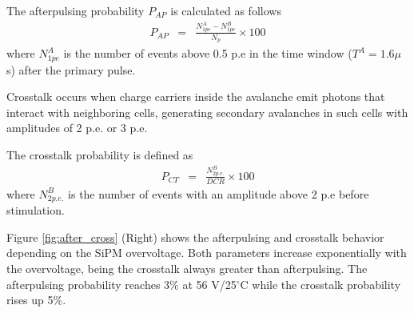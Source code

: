 \documentclass[a4paper,11pt]{article}
\begin{document}


The afterpulsing probability $P_{AP}$ is calculated as follows
\begin{eqnarray}
    P_{AP} &=& \frac{N_{1pe}^A-N_{1pe}^B}{N_p}\times 100
    \label{AP_eq}
\end{eqnarray}
where $N_{1pe}^A$ is the number of events above 0.5 p.e in the time window ($T^A = 1.6 \mu$ s) after the primary pulse. 

Crosstalk occurs when charge carriers inside the avalanche emit photons that interact with neighboring cells, generating secondary avalanches in such cells with amplitudes of 2 p.e. or 3 p.e.



The crosstalk probability is defined as
\begin{eqnarray}
    P_{CT} &=&\frac{N_{2p.e.}^B}{DCR}\times 100
    \label{CT_eq}
\end{eqnarray}
where $N_{2p.e.}^B$ is the number of events with an amplitude above 2 p.e before stimulation.

Figure \ref{fig:after_cross} (Right) shows the afterpulsing and crosstalk behavior depending on the SiPM overvoltage. Both parameters increase exponentially with the overvoltage, being the crosstalk always greater than afterpulsing. The afterpulsing probability reaches 3$\%$ at 56 V/25$^{\circ}$C while the crosstalk probability rises up 5$\%$.
\end{document}
